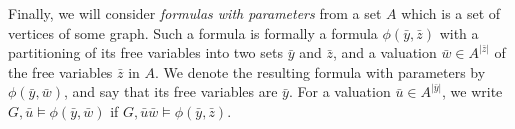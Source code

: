 Finally, we will consider \emph{formulas with parameters}
from a set  $A$ which is a set of vertices of some graph.
Such a formula is formally a formula $\phi(\bar y,\bar z)$
with a partitioning of its free variables into two sets $\bar y$ and $\bar z$,
and a valuation $\bar w\in A^{|\bar z|}$ of the free variables $\bar z$ in $A$. 
We denote the resulting formula with parameters by $\phi(\bar y,\bar w)$, and say that its free variables 
are $\bar y$. For a valuation $\bar u\in A^{|\bar y|}$,
we write $G,\bar u\models \phi(\bar y,\bar w)$
if $G,\bar u\bar w\models \phi(\bar y,\bar z)$.



%


